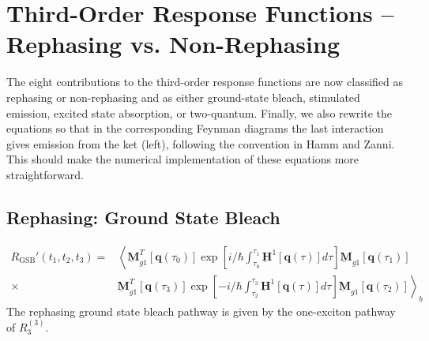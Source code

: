 \documentclass{article}
\newcommand{\bra}[1]{\ensuremath{\left\langle#1\right|}}
\newcommand{\ket}[1]{\ensuremath{\left|#1\right\rangle}}
\newcommand{\vect}[1]{\ensuremath{\boldsymbol{\mathbf{#1}}}}
\newcommand{\arw}{-{Latex[length=2mm]}}
\begin{document}
\clearpage
\section{Third-Order Response Functions -- Rephasing vs. Non-Rephasing}
The eight contributions to the third-order response functions are now classified as rephasing or non-rephasing and as either ground-state bleach, stimulated emission, excited state absorption, or two-quantum.\cite{Hamm2011}
Finally, we also rewrite the equations so that in the corresponding Feynman diagrams the last interaction gives emission from the ket (left), following the convention in Hamm and Zanni.\cite{Hamm2011}
This should make the numerical implementation of these equations more straightforward.

\subsection{Rephasing: Ground State Bleach}
\begin{figure}[h]
\centering
{}
\end{figure}
\begin{equation}
\begin{split}
 R_\mathrm{GSB}'(t_{1},t_{2},t_{3})=&\left\langle\underbar{\vect{M}}_{g1}^{T}[\vect q(\tau_{0})]\exp\left[i/\hbar\int_{\tau_{0}}^{\tau_{1}}\underbar{\vect{H}}^{1}[\vect q(\tau)]d\tau\right] \underbar{\vect{M}}_{g1} [\vect q(\tau_{1})]\right.\\
			  \times&\left.\underbar{\vect{M}}_{g1}^{T}[\vect q(\tau_{3})]\exp\left[-i/\hbar\int_{\tau_{2}}^{\tau_{3}}\underbar{\vect{H}}^{1}[\vect q(\tau)]d\tau\right] \underbar{\vect{M}}_{g1} [\vect q(\tau_{2})]\right\rangle_{b}
\end{split}
\end{equation}
The rephasing ground state bleach pathway is given by the one-exciton pathway of $R_{3}^{(3)}$.

\clearpage
\end{document}
